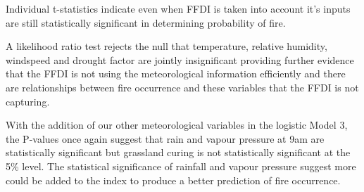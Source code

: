\documentclass[11pt,a4paper]{article}
\begin{document}
Individual t-statistics indicate even when FFDI is taken into account it's inputs are still statistically significant in determining probability of fire.

A likelihood ratio test rejects the null that temperature, relative humidity, windspeed and drought factor are jointly insignificant providing further evidence that the FFDI is not using the meteorological information efficiently and there are relationships between fire occurrence and these variables that the FFDI is not capturing.


With the addition of our other meteorological variables in the logistic Model 3, the P-values once again suggest that rain and vapour pressure at 9am are statistically significant but grassland curing is not statistically significant at the 5\% level. The statistical significance of rainfall and vapour pressure suggest more could be added to the index to produce a better prediction of fire occurrence.
\end{document}
